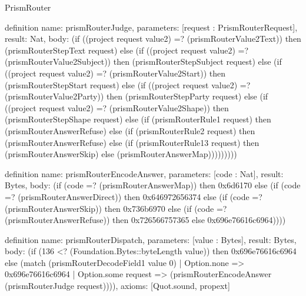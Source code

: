 \begin{lexlean}{PrismRouter}
\begin{semanticmodule}
definition{
  name: prismRouterJudge,
  parameters: [request : PrismRouterRequest],
  result: Nat,
  body: (if ((project request value2) =? (prismRouterValue2Text)) then (prismRouterStepText request) else (if ((project request value2) =? (prismRouterValue2Subject)) then (prismRouterStepSubject request) else (if ((project request value2) =? (prismRouterValue2Start)) then (prismRouterStepStart request) else (if ((project request value2) =? (prismRouterValue2Party)) then (prismRouterStepParty request) else (if ((project request value2) =? (prismRouterValue2Shape)) then (prismRouterStepShape request) else (if (prismRouterRule1 request) then (prismRouterAnswerRefuse) else (if (prismRouterRule2 request) then (prismRouterAnswerRefuse) else (if (prismRouterRule13 request) then (prismRouterAnswerSkip) else (prismRouterAnswerMap)))))))))
}

definition{
  name: prismRouterEncodeAnswer,
  parameters: [code : Nat],
  result: Bytes,
  body: (if (code =? (prismRouterAnswerMap)) then 0x6d6170 else (if (code =? (prismRouterAnswerDirect)) then 0x646972656374 else (if (code =? (prismRouterAnswerSkip)) then 0x736b6970 else (if (code =? (prismRouterAnswerRefuse)) then 0x726566757365 else 0x696e76616c6964))))
}

definition{
  name: prismRouterDispatch,
  parameters: [value : Bytes],
  result: Bytes,
  body: (if (136 <? (Foundation.Bytes::byteLength value)) then 0x696e76616c6964 else (match (prismRouterDecodeField1 value 0)
    | Option.none => 0x696e76616c6964
    | Option.some request => (prismRouterEncodeAnswer (prismRouterJudge request)))),
  axioms: [Quot.sound, propext]
}
\end{semanticmodule}
\end{lexlean}
